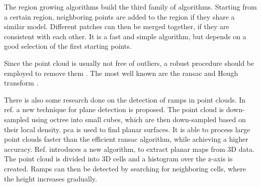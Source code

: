 The region growing algorithms \cite{Besl1988, Taubin1991} build the third family of algorithms.
Starting from a certain region, neighboring points are added to the region if they share a similar model.
Different patches can then be merged together, if they are consistent with each other.
It is a fast and simple algorithm, but depends on a good selection of the first starting points.\par
Since the point cloud is usually not free of outliers, a robust procedure should be employed to remove them \cite{Stewart1999,Meer2004}.
The most well known are the \gls{ransac} \cite{Fischler1981} and Hough transform \cite{Illingworth1988}.\par
There is also some research done on the detection of ramps in point clouds.
In ref. \cite{El-Sayed2018} a new technique for plane detection is proposed.
The point cloud is down-sampled using octree into small cubes, which are then down-sampled based on their local density.
\gls{pca} is used to find planar surfaces.
It is able to process large point clouds faster than the efficient \gls{ransac} algorithm, while achieving a higher accuracy.
Ref. \cite{Sakenas2007} introduces a new algorithm, to extract planar maps from 3D data.
The point cloud is divided into 3D cells and a histogram over the z-axis is created.
Ramps can then be detected by searching for neighboring cells, where the height increases gradually.\par

